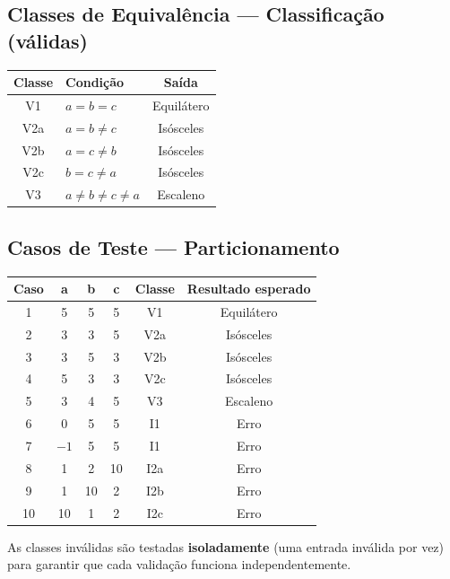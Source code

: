 \documentclass[12pt,a4paper]{article}
\begin{document}
\subsection{Classes de Equivalência --- Classificação (válidas)}

\begin{center}
\begin{tabular}{clc}
\toprule
\textbf{Classe} & \textbf{Condição} & \textbf{Saída} \\
\midrule
V1  & $a = b = c$ & Equilátero \\
V2a & $a = b \neq c$ & Isósceles \\
V2b & $a = c \neq b$ & Isósceles \\
V2c & $b = c \neq a$ & Isósceles \\
V3  & $a \neq b \neq c \neq a$ & Escaleno \\
\bottomrule
\end{tabular}
\end{center}

\subsection{Casos de Teste --- Particionamento}

\begin{center}
\begin{tabular}{cccccc}
\toprule
\textbf{Caso} & \textbf{a} & \textbf{b} & \textbf{c} & \textbf{Classe} & \textbf{Resultado esperado} \\
\midrule
1  & 5  & 5  & 5  & V1  & Equilátero \\
2  & 3  & 3  & 5  & V2a & Isósceles \\
3  & 3  & 5  & 3  & V2b & Isósceles \\
4  & 5  & 3  & 3  & V2c & Isósceles \\
5  & 3  & 4  & 5  & V3  & Escaleno \\
\midrule
6  & 0  & 5  & 5  & I1  & Erro \\
7  & $-1$ & 5  & 5  & I1  & Erro \\
8  & 1  & 2  & 10 & I2a & Erro \\
9  & 1  & 10 & 2  & I2b & Erro \\
10 & 10 & 1  & 2  & I2c & Erro \\
\bottomrule
\end{tabular}
\end{center}

\noindent As classes inválidas são testadas \textbf{isoladamente} (uma entrada inválida por vez) para garantir que cada validação funciona independentemente.
\end{document}
